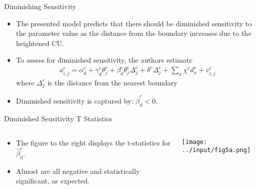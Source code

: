 \documentclass[11pt, aspectratio=169]{beamer}
\begin{document}

\begin{frame}{Diminishing Sensitivity}
    
    \begin{itemize}
        \item The presented model 
            predicts that there should be diminished 
            sensitivity to the parameter value
            as the distance from the boundary
            increases due to the heightened 
            CU.
        \item To assess for diminished sensitivity, the 
            authors estimate
            \begin{align}
                a_{i, j}^e=\alpha_d^e+\gamma_d^e \theta_j^e+\beta_d^e \theta_j^e \Delta_j^e+\delta^e \Delta_j^e+\sum_x \chi^e d_x^e+v_{i, j}^e
            \end{align}
            where $\Delta_j^e$ is the distance from the
            nearest boundary
        \item Diminished sensitivity is captured by: $\hat{\beta}_d^e<0$.
    \end{itemize}

\end{frame}


\begin{frame}{Diminished Sensitivity T Statistics}


    \begin{columns}
    
        \begin{column}{0.4\textwidth}
            \begin{itemize}
                \item The figure to the 
                    right displays the 
                    t-statistics for  
                    $\hat{\beta}_d^e$.
                \item Almost are all 
                    negative and statistically 
                    significant, as expected.
            \end{itemize}
        \end{column}
    
        \begin{column}{0.7\textwidth}
            \texttt{[image: ../input/fig5a.png]}
        \end{column}
    
    \end{columns}
    
\end{frame}
\end{document}

